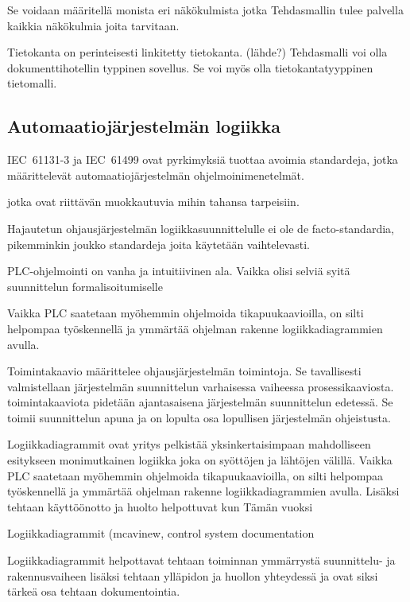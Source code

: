 \documentclass[finnish,12pt]{article}
\begin{document}
Se voidaan määritellä monista eri näkökulmista jotka Tehdasmallin tulee palvella kaikkia näkökulmia joita tarvitaan.

Tietokanta on perinteisesti linkitetty tietokanta. (lähde?) Tehdasmalli voi olla dokumenttihotellin typpinen sovellus. Se voi myös olla tietokantatyyppinen tietomalli.


	\subsection{Automaatiojärjestelmän logiikka}


IEC~61131-3 ja IEC~61499 ovat pyrkimyksiä tuottaa avoimia standardeja, jotka määrittelevät automaatiojärjestelmän ohjelmoinimenetelmät.

jotka ovat riittävän muokkautuvia mihin tahansa tarpeisiin.

Hajautetun ohjausjärjestelmän logiikkasuunnittelulle ei ole de facto-standardia, pikemminkin joukko standardeja joita käytetään vaihtelevasti.

PLC-ohjelmointi on vanha ja intuitiivinen ala. Vaikka olisi selviä syitä suunnittelun formalisoitumiselle

Vaikka PLC saatetaan myöhemmin ohjelmoida tikapuukaavioilla, on silti helpompaa työskennellä ja ymmärtää ohjelman rakenne logiikkadiagrammien avulla.


Toimintakaavio määrittelee ohjausjärjestelmän toimintoja. Se tavallisesti valmistellaan järjestelmän suunnittelun varhaisessa vaiheessa prosessikaaviosta. toimintakaaviota pidetään ajantasaisena järjestelmän suunnittelun edetessä. Se toimii suunnittelun apuna ja on lopulta osa lopullisen järjestelmän ohjeistusta.

Logiikkadiagrammit ovat yritys pelkistää yksinkertaisimpaan mahdolliseen esitykseen monimutkainen logiikka joka on syöttöjen ja lähtöjen välillä. Vaikka PLC saatetaan myöhemmin ohjelmoida tikapuukaavioilla, on silti helpompaa työskennellä ja ymmärtää ohjelman rakenne logiikkadiagrammien avulla. Lisäksi tehtaan käyttöönotto ja huolto helpottuvat kun
Tämän vuoksi 

Logiikkadiagrammit (mcavinew, control system documentation

Logiikkadiagrammit helpottavat tehtaan toiminnan ymmärrystä suunnittelu- ja rakennusvaiheen lisäksi tehtaan ylläpidon ja huollon yhteydessä ja ovat siksi tärkeä osa tehtaan dokumentointia.
\end{document}
